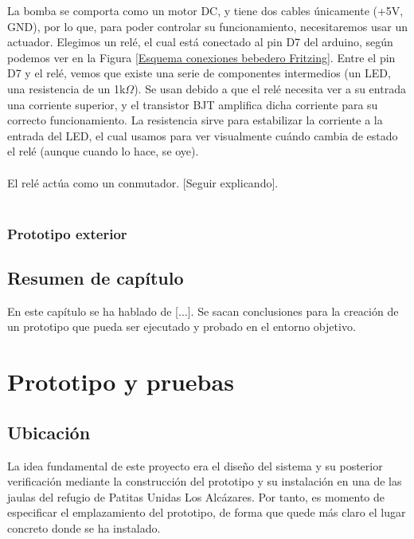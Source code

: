 \documentclass[12pt]{article}
\begin{document}
	\noindent La bomba se comporta como un motor DC, y tiene dos cables únicamente (+5V, GND), por lo que, para poder controlar su funcionamiento, necesitaremos usar un actuador. Elegimos un relé, el cual está conectado al pin D7 del arduino, según podemos ver en la Figura \ref{Esquema conexiones bebedero Fritzing}. Entre el pin D7 y el relé, vemos que existe una serie de componentes intermedios (un LED, una resistencia de un 1k$\Omega$). Se usan debido a que el relé necesita ver a su entrada una corriente superior, y el transistor BJT amplifica dicha corriente para su correcto funcionamiento. La resistencia sirve para estabilizar la corriente a la entrada del LED, el cual usamos para ver visualmente cuándo cambia de estado el relé (aunque cuando lo hace, se oye). \\
	
	 \\
	
	\noindent El relé actúa como un conmutador. [Seguir explicando]. \\
	
	 \\
	
	\subsubsection{Prototipo exterior}
		
	\subsection[Resumen del capítulo]{Resumen de capítulo}
	
	En este capítulo se ha hablado de [...]. Se sacan conclusiones para la creación de un prototipo que pueda ser ejecutado y probado en el entorno objetivo.
	\pagebreak
	
	
	\section[Prototipo y pruebas]{Prototipo y pruebas}
	
	\subsection[Ubicación]{Ubicación}

	\noindent La idea fundamental de este proyecto era el diseño del sistema y su posterior
verificación mediante la construcción del prototipo y su instalación en una de las jaulas del refugio de Patitas Unidas Los Alcázares. Por tanto, es momento de especificar el
emplazamiento del prototipo, de forma que quede más claro el lugar concreto donde
se ha instalado. \\
	
\end{document}

